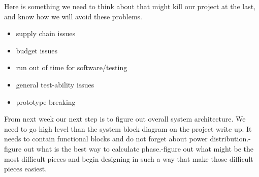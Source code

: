 \documentclass{article}
\begin{document}
Here is something we need to think about that might kill our project at the
last, and know how we will avoid these problems.
\begin{itemize}
\item{supply chain issues}
\item{budget issues }
\item{run out of time for software/testing }
\item{general test-ability issues}
\item{prototype breaking}
\end{itemize}

From next week our next step is to figure out overall system architecture. We
need to go high level than the system block diagram on the project write up. It
needs to contain functional blocks and do not forget about power distribution.-
figure out what is the best way to calculate phase.-figure out what might be
the most difficult pieces and begin designing in such a way that make those
difficult pieces easiest.
\end{document}
